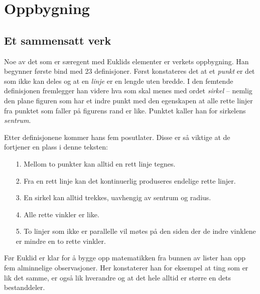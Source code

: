 \documentclass[norsk,twoside,utf8]{article}
\begin{document}
\section{Oppbygning}
\subsection{Et sammensatt verk}

Noe av det som er særegent med Euklids elementer er verkets oppbygning. Han begynner første bind med 23 definisjoner. Først konstateres det at et \textit{punkt} er det som ikke kan deles og at en \textit{linje} er en lengde uten bredde. I den femtende definisjonen fremlegger han videre hva som skal menes med ordet \textit{sirkel} -- nemlig den plane figuren som har et indre punkt med den egenskapen at alle rette linjer fra punktet som faller på figurens rand er like. Punktet kaller han for sirkelens \textit{sentrum}. 

Etter definisjonene kommer hans fem posutlater. Disse er så viktige at de fortjener en plass i denne teksten:
\begin{itemize}
\item[1.] Mellom to punkter kan alltid en rett linje tegnes.
\item[2.] Fra en rett linje kan det kontinuerlig produseres endelige rette linjer. 
\item[3.] En sirkel kan alltid trekkes, uavhengig av sentrum og radius. 
\item[4.] Alle rette vinkler er like.
\item[5.] To linjer som ikke er parallelle vil møtes på den siden der de indre vinklene er mindre en to rette vinkler.
\end{itemize}
Før Euklid er klar for å bygge opp matematikken fra bunnen av lister han opp fem alminnelige observasjoner. Her konstaterer han for eksempel at ting som er lik det samme, er også lik hverandre og at det hele alltid er større en dets bestanddeler. 
\end{document}
